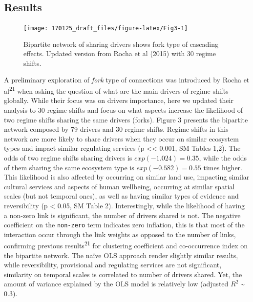 \documentclass[9pt,]{article}
\begin{document}
\subsection{Results}\label{results}

\begin{figure}

{\centering \texttt{[image: 170125\_draft\_files/figure-latex/Fig3-1]} 

}

\caption{Bipartite network of sharing drivers shows fork type of cascading effects. Updated version from Rocha et al (2015) with 30 regime shifts.}\label{fig:Fig3}
\end{figure}

A preliminary exploration of \emph{fork} type of connections was
introduced by Rocha et al\textsuperscript{21} when asking the question
of what are the main drivers of regime shifts globally. While their
focus was on drivers importance, here we updated their analysis to 30
regime shifts and focus on what aspects increase the likelihood of two
regime shifts sharing the same drivers (forks). Figure 3 presents the
bipartite network composed by 79 drivers and 30 regime shifts. Regime
shifts in this network are more likely to share drivers when they occur
on similar ecosystem types and impact similar regulating services (p
\textless{}\textless{} 0.001, SM Tables 1,2). The odds of two regime
shifts sharing drivers is \(exp(-1.024) = 0.35\), while the odds of them
sharing the same ecosystem type is \(exp(-0.582) = 0.55\) times higher.
This likelihood is also affected by occurring on similar land use,
impacting similar cultural services and aspects of human wellbeing,
occurring at similar spatial scales (but not temporal ones), as well as
having similar types of evidence and reversibility (p \textless{} 0.05,
SM Table 2). Interestingly, while the likelihood of having a non-zero
link is significant, the number of drivers shared is not. The negative
coefficient on the \texttt{non-zero} term indicates zero inflation, this
is that most of the interaction occur through the link weights as
opposed to the number of links, confirming previous
results\textsuperscript{21} for clustering coefficient and co-occurrence
index on the bipartite network. The naïve OLS approach render slightly
similar results, while reversibility, provisional and regulating
services are not significant, similarity on temporal scales is
correlated to number of drivers shared. Yet, the amount of variance
explained by the OLS model is relatively low (adjusted \(R^2\)
\textasciitilde{} 0.3).
\end{document}

